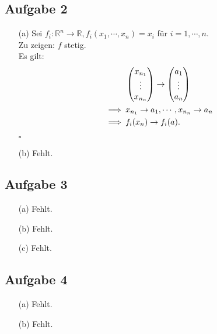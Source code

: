 \documentclass[12pt]{article}
\newcommand{\QED}{\begin{flushright} $\square$ \end{flushright}}
\newcommand{\df}{\enspace\Longrightarrow\enspace}
\newcommand{\vek}[2]{\begin{pmatrix}#1 \\ $\vdots$ \\ #2\end{pmatrix}}
\begin{document}
\subsection*{Aufgabe 2}
\begin{enumerate}
	\item[(a)] Sei $f_i:\mathbb{R}^n\rightarrow\mathbb{R}, f_i(x_1,\cdots,x_n)=x_i$ für $i=1,\cdots,n$. \\
	Zu zeigen: $f$ stetig. \\
	Es gilt:
	\begin{align*}
		&\vek{x_{n_1}}{x_{n_n}}\rightarrow\vek{a_1}{a_n} \\
		\df &x_{n_1}\rightarrow a_1,\cdots,x_{n_n}\rightarrow a_n \\
		\df &f_i(x_n)\rightarrow f_i(a).
	\end{align*}
	\QED
	
	\item[(b)] Fehlt.
\end{enumerate}

\subsection*{Aufgabe 3}
\begin{enumerate}
	\item[(a)] Fehlt.
	
	\item[(b)] Fehlt.
	
	\item[(c)] Fehlt.
\end{enumerate}

\subsection*{Aufgabe 4}
\begin{enumerate}
	\item[(a)] Fehlt.
	
	\item[(b)] Fehlt.
\end{enumerate}
\end{document}
